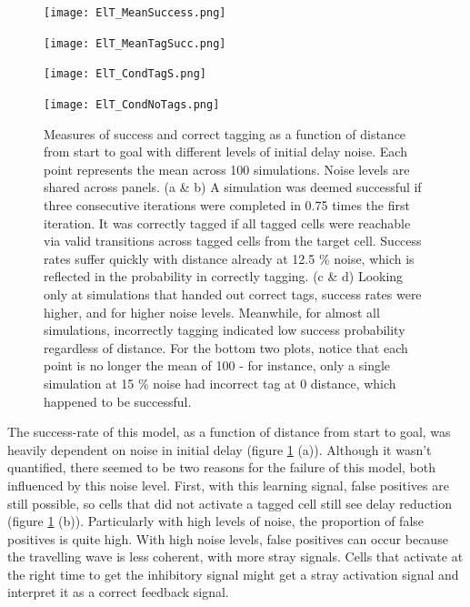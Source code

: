 \documentclass{article}
\begin{document}
    \begin{figure}[H]
        \begin{minipage}[t]{0.5\linewidth}
            \subcaption{}
            \texttt{[image: ElT\_MeanSuccess.png]}
        \end{minipage}
        \begin{minipage}[t]{0.5\linewidth}
            \subcaption{}
            \texttt{[image: ElT\_MeanTagSucc.png]}
        \end{minipage}
        \begin{minipage}[t]{0.5\linewidth}
            \subcaption{}
            \texttt{[image: ElT\_CondTagS.png]}
        \end{minipage}
        \begin{minipage}[t]{0.5\linewidth}
            \subcaption{}
            \texttt{[image: ElT\_CondNoTags.png]}
        \end{minipage}
        \caption{Measures of success and correct tagging as a function of distance from start to goal with different levels of initial delay noise. Each point represents the mean across 100 simulations. Noise levels are shared across panels. (a \& b) A simulation was deemed successful if three consecutive iterations were completed in 0.75 times the first iteration. It was correctly tagged if all tagged cells were reachable via valid transitions across tagged cells from the target cell. Success rates suffer quickly with distance already at 12.5 \% noise, which is reflected in the probability in correctly tagging. (c \& d) Looking only at simulations that handed out correct tags, success rates were higher, and for higher noise levels. Meanwhile, for almost all simulations, incorrectly tagging indicated low success probability regardless of distance. For the bottom two plots, notice that each point is no longer the mean of 100 - for instance, only a single simulation at 15 \% noise had incorrect tag at 0 distance, which happened to be successful.}
        \label{success_rates_plot}
    \end{figure}

    The success-rate of this model, as a function of distance from start to goal, was heavily dependent on noise in initial delay (figure \ref{success_rates_plot} (a)). Although it wasn't quantified, there seemed to be two reasons for the failure of this model, both influenced by this noise level. First, with this learning signal, false positives are still possible, so cells that did not activate a tagged cell still see delay reduction (figure \ref{success_rates_plot} (b)). Particularly with high levels of noise, the proportion of false positives is quite high. With high noise levels, false positives can occur because the travelling wave is less coherent, with more stray signals. Cells that activate at the right time to get the inhibitory signal might get a stray activation signal and interpret it as a correct feedback signal.
\end{document}
